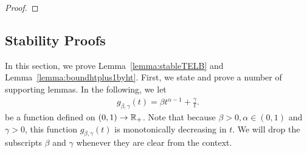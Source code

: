 \begin{proof}
\end{proof}

\subsection{Stability Proofs}
\label{sec:stabilityproofs}

In this section, we prove Lemma~\ref{lemma:stableTELB} and Lemma~\ref{lemma:boundhtplus1byht}.
First, we state and prove a number of supporting lemmas. In the following, we let 
    \begin{align}
        g_{\beta, \gamma}(t) = \beta t^{\alpha - 1} + \frac{\gamma}{t}.
        \label{eq:gt}
    \end{align}
be a function defined on $(0,1) \to \mathbb{R}_+$. Note that because $\beta > 0, \alpha \in (0,1)$ and $\gamma > 0$, this function $g_{\beta, \gamma}(t)$ is monotonically decreasing in $t$. We will drop the subscripts $\beta$ and $\gamma$ whenever they are clear from the context.

